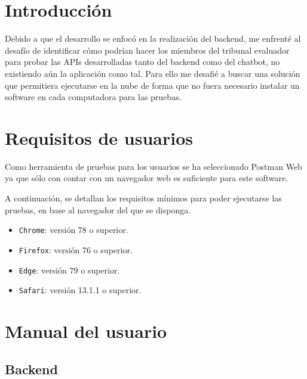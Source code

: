 
\section{Introducción}
Debido a que el desarrollo se enfocó en la realización del backend, me enfrenté al desafío de identificar cómo podrían hacer los miembros del tribunal evaluador para probar las APIs desarrolladas tanto del backend como del chatbot, no existiendo aún la aplicación como tal.
Para ello me desafié a buscar una solución que permitiera ejecutarse en la nube de forma que no fuera necesario instalar un software en cada computadora para las pruebas.

\section{Requisitos de usuarios}
Como herramienta de pruebas para los usuarios se ha seleccionado Postman Web ya que sólo con contar con un navegador web es suficiente para este software.

A continuación, se detallan los requisitos mínimos para poder ejecutarse las pruebas, en base al navegador del que se disponga.

\begin{itemize}
\tightlist
\item
  \texttt{Chrome}: versión 78 o superior.
  \item
  \texttt{Firefox}: versión 76 o superior.
  \item
  \texttt{Edge}: versión 79 o superior.
  \item
  \texttt{Safari}: versión 13.1.1 o superior.
\end{itemize}

\section{Manual del usuario}

\subsection{Backend}

